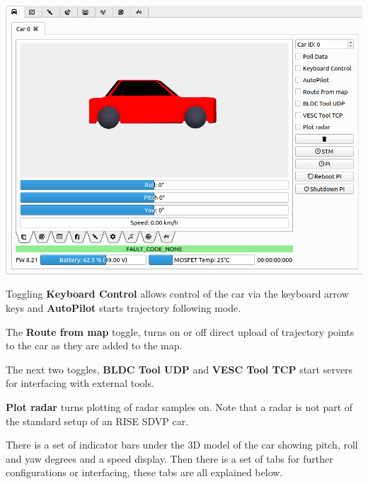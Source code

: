 \documentclass[12pt]{article} %
\begin{document}
\noindent \begin{minipage}{0.5\textwidth}
    \noindent \includegraphics[width=\textwidth]{./screens/Car_orientation.png}
\end{minipage}
\begin{minipage}{0.5\textwidth} %

  Toggling {\bf Keyboard Control} allows control of the car via the
  keyboard arrow keys and {\bf AutoPilot} starts trajectory following
  mode.

  The {\bf Route from map} toggle, turns on or off direct upload of
  trajectory points to the car as they are added to the map.

  The next two toggles, {\bf BLDC Tool UDP} and {\bf VESC Tool TCP}
  start servers for interfacing with external tools. 

  {\bf Plot radar} turns plotting of radar samples on. Note that a
  radar is not part of the standard setup of an RISE SDVP car.
\end{minipage}

There is a set of indicator bars under the 3D model of the car showing
pitch, roll and yaw degrees and a speed display. Then there is a set
of tabs for further configurations or interfacing, these tabs are all
explained below.

\end{document}
